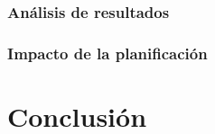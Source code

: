 \documentclass[12pt]{article}
\newcommand\blankpage{%
    \null
    \thispagestyle{empty}%
    \addtocounter{page}{-1}%
    \newpage}
\begin{document}
        
        \subsubsection{Análisis de resultados}
        \subsubsection{Impacto de la planificación}
    \newpage
    \section{Conclusión}
    \noindent
    \newpage
    \blankpage
\end{document}
